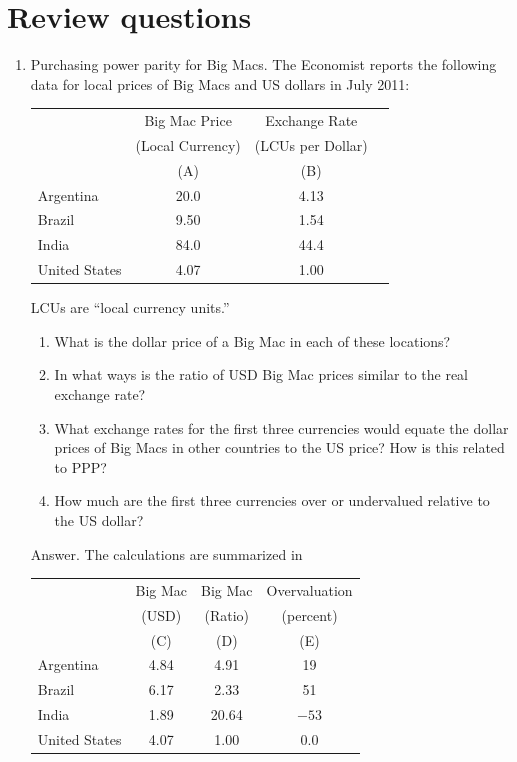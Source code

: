 \section*{Review questions}

\setlength{\leftmargini}{.5\oldleftmargini}
\begin{enumerate}
\item Purchasing power parity for Big Macs.
The Economist reports the following data for
local prices of Big Macs and US dollars in July 2011:
%
\begin{center}
\begin{tabular}{lccc}
\toprule
        & Big Mac Price  &  Exchange Rate    \\
        &(Local Currency)&(LCUs per Dollar)   \\
        &  (A)  &  (B) \\
\midrule
Argentina       &  20.0  &  4.13  \\
Brazil          &  9.50  &  1.54 \\
India           &  84.0  &  44.4   \\
United States   &  4.07  &  1.00   \\
\bottomrule
\end{tabular}
\end{center}
LCUs are ``local currency units.''


\begin{enumerate}
\item What is the dollar price of a Big Mac in each of these locations?
\item In what ways is the ratio of USD Big Mac prices similar to the real exchange rate?
\item What exchange rates for the first three currencies would
equate the dollar prices of Big Macs in other countries to the US price?
How is this related to PPP?
\item How much are the first three currencies over or undervalued
relative to the US dollar?
\end{enumerate}

Answer.  The calculations are summarized in
%
{\small
\begin{center}
\begin{tabular}{lccc}
\toprule
        & Big Mac   &  Big Mac  & Overvaluation\\
        &  (USD)&   (Ratio) &  (percent)\\
        & (C) & (D) & (E)  \\
\midrule
Argentina       &  4.84 &  4.91  &  19\\
Brazil          &  6.17 &  2.33  & 51\\
India           &  1.89 &  20.64 & $-53$\\
United States   &  4.07 &  1.00  & 0.0\\
\bottomrule
\end{tabular}
\end{center}
}


\end{enumerate}
